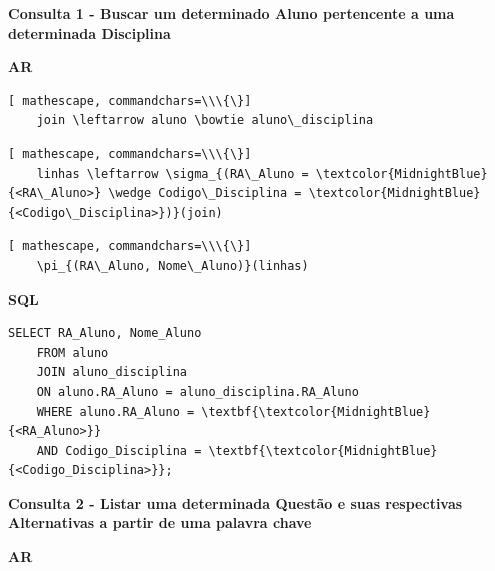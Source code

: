 \documentclass[12pt,a4paper]{article}
\begin{document}

\begin{center}
    \textbf{Consulta 1 - Buscar um determinado Aluno pertencente a uma determinada Disciplina}
\end{center}
\begin{center}
    \textbf{AR}
\end{center}

\begin{Verbatim}[ mathescape, commandchars=\\\{\}]
    join \leftarrow aluno \bowtie aluno\_disciplina
\end{Verbatim}
\begin{Verbatim}[ mathescape, commandchars=\\\{\}]
    linhas \leftarrow \sigma_{(RA\_Aluno = \textcolor{MidnightBlue}{<RA\_Aluno>} \wedge Codigo\_Disciplina = \textcolor{MidnightBlue}{<Codigo\_Disciplina>})}(join)
\end{Verbatim}
\begin{Verbatim}[ mathescape, commandchars=\\\{\}]
    \pi_{(RA\_Aluno, Nome\_Aluno)}(linhas)
\end{Verbatim}

\begin{center}
    \textbf{SQL}
\end{center}
\begin{Verbatim}[commandchars=\\\{\}]
    SELECT RA_Aluno, Nome_Aluno
    FROM aluno
    JOIN aluno_disciplina
    ON aluno.RA_Aluno = aluno_disciplina.RA_Aluno
    WHERE aluno.RA_Aluno = \textbf{\textcolor{MidnightBlue}{<RA_Aluno>}}
    AND Codigo_Disciplina = \textbf{\textcolor{MidnightBlue}{<Codigo_Disciplina>}};
\end{Verbatim}

\vspace{0.5cm}
\begin{center}
    \textbf{Consulta 2 - Listar uma determinada Questão e suas respectivas Alternativas a partir de uma palavra chave }
\end{center}
\begin{center}
    \textbf{AR}
\end{center}
\end{document}
